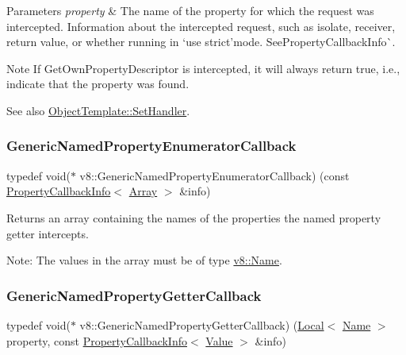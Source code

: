 \begin{DoxyParams}{Parameters}
{\em property} & The name of the property for which the request was intercepted.  Information about the intercepted request, such as isolate, receiver, return value, or whether running in `\textquotesingle{}use strict'{\ttfamily mode. See}Property\+Callback\+Info\`{}.\\
\hline
\end{DoxyParams}
\begin{DoxyNote}{Note}
If Get\+Own\+Property\+Descriptor is intercepted, it will always return true, i.\+e., indicate that the property was found.
\end{DoxyNote}
See also {\ttfamily \mbox{\hyperlink{classv8_1_1ObjectTemplate_a3d5666f1e9b0f46df6b4dbb7cfbb6114}{Object\+Template\+::\+Set\+Handler}}}. \mbox{\label{namespacev8_a20826eb7e52e84fa4f632534e8eddd04}} 
\subsubsection{\texorpdfstring{Generic\+Named\+Property\+Enumerator\+Callback}{GenericNamedPropertyEnumeratorCallback}}
{\footnotesize\ttfamily typedef void($\ast$ v8\+::\+Generic\+Named\+Property\+Enumerator\+Callback) (const \mbox{\hyperlink{classv8_1_1PropertyCallbackInfo}{Property\+Callback\+Info}}$<$ \mbox{\hyperlink{classv8_1_1Array}{Array}} $>$ \&info)}

Returns an array containing the names of the properties the named property getter intercepts.

Note\+: The values in the array must be of type \mbox{\hyperlink{classv8_1_1Name}{v8\+::\+Name}}. \mbox{\label{namespacev8_a24b1801fa53a7c5a71366d8044927563}} 
\subsubsection{\texorpdfstring{Generic\+Named\+Property\+Getter\+Callback}{GenericNamedPropertyGetterCallback}}
{\footnotesize\ttfamily typedef void($\ast$ v8\+::\+Generic\+Named\+Property\+Getter\+Callback) (\mbox{\hyperlink{classv8_1_1Local}{Local}}$<$ \mbox{\hyperlink{classv8_1_1Name}{Name}} $>$ property, const \mbox{\hyperlink{classv8_1_1PropertyCallbackInfo}{Property\+Callback\+Info}}$<$ \mbox{\hyperlink{classv8_1_1Value}{Value}} $>$ \&info)}

